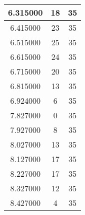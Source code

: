 \begin{longtable}[htbp]{|c|c|c|}
6.315000 & 18 & 35 \\ \hline
6.415000 & 23 & 35 \\ \hline
6.515000 & 25 & 35 \\ \hline
6.615000 & 24 & 35 \\ \hline
6.715000 & 20 & 35 \\ \hline
6.815000 & 13 & 35 \\ \hline
6.924000 & 6 & 35 \\ \hline
7.827000 & 0 & 35 \\ \hline
7.927000 & 8 & 35 \\ \hline
8.027000 & 13 & 35 \\ \hline
8.127000 & 17 & 35 \\ \hline
8.227000 & 17 & 35 \\ \hline
8.327000 & 12 & 35 \\ \hline
8.427000 & 4 & 35 \\ \hline
\end{longtable}
